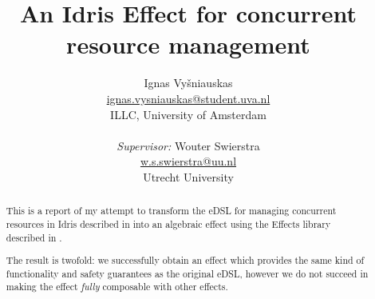 \documentclass{article}
\title{An Idris Effect for concurrent resource management}
\author{Ignas Vyšniauskas \\ \url{ignas.vysniauskas@student.uva.nl} \\
        ILLC, University of Amsterdam \\
    \\ \textit{Supervisor:} Wouter Swierstra
    \\ \url{w.s.swierstra@uu.nl}
    \\ Utrecht University
}
\begin{document}
\maketitle

\begin{abstract}
    This is a report of my attempt to transform the eDSL for managing
    concurrent resources in Idris described in \cite{cbconc-fi} into an
    algebraic effect using the Effects library described in \cite{effects-idr}.

    The result is twofold: we successfully obtain an effect which provides the
    same kind of functionality and safety guarantees as the original eDSL,
    however we do not succeed in making the effect \emph{fully} composable with
    other effects.
\end{abstract}









\end{document}
